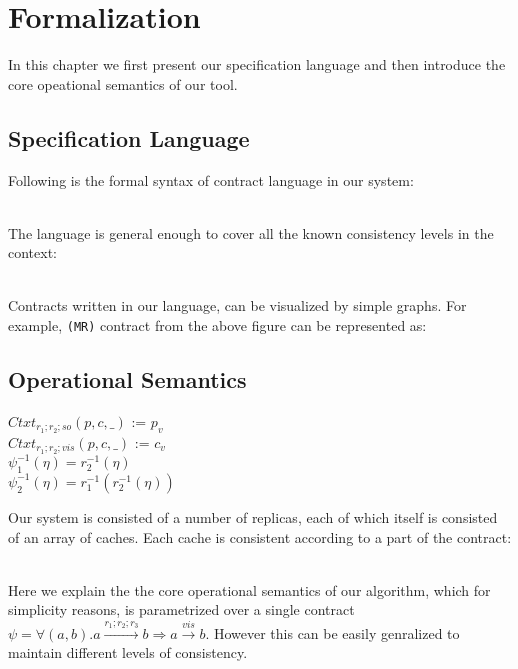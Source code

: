 \section{Formalization}
In this chapter we first present our specification language and then
introduce the core opeational semantics of our tool.
\subsection{Specification Language}
Following is the formal syntax of contract language in our system:

\\ The language is general enough to cover all  the known consistency
levels in the context:

\\ Contracts written in our language, can be visualized by simple graphs. For example, \texttt{(MR)} contract from the above figure can be represented as:



\newpage
\subsection{Operational Semantics}
\begin{center}
$Ctxt_{r_1;r_2;so}(p,c,\_)$ := $p_v$\\
$Ctxt_{r_1;r_2;vis}(p,c,\_)$ := $c_v$\\
$\psi_1^{-1}(\eta) = r_2^{-1}(\eta)$\\
$\psi_2^{-1}(\eta) = r_1^{-1}(r_2^{-1}(\eta))$
\end{center}
Our system is consisted of a number of replicas, each of which itself is consisted of an array of caches. Each cache is consistent according to a part of the contract:

\\ Here we explain the the core operational semantics of our algorithm, which for simplicity reasons, 
is parametrized over a single contract 
$\psi = \forall (a,b). a \xrightarrow{r_1;r_2;r_3} b  \Rightarrow a \xrightarrow{vis} b$. 
However this can be easily  genralized to maintain different levels of consistency. 

